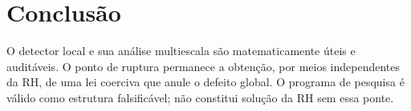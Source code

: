 \documentclass[11pt,a4paper]{article}
\begin{document}
\section{Conclusão}
O detector local e sua análise multiescala são matematicamente úteis e auditáveis. O ponto de ruptura permanece a obtenção, por meios independentes da RH, de uma lei coerciva que anule o defeito global. O programa de pesquisa é válido como estrutura falsificável; não constitui solução da RH sem essa ponte.
\end{document}
